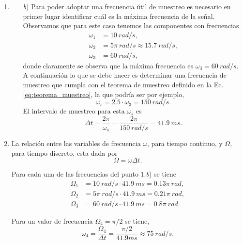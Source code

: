 \documentclass[10pt,a4paper]{article}
\begin{document}
\begin{enumerate}
\item 
\begin{enumerate}
\item[\textit{b})]
Para poder adoptar una frecuencia útil de muestreo es necesario en primer lugar identificar cuál es la máxima frecuencia de la señal. Observamos que para este caso tenemos las componentes con frecuencias
\begin{align}
\omega_1 &= 10 ~rad/s, \\
\omega_2 &= 5\pi ~rad/s \approx 15.7 ~rad/s, \\
\omega_3 &= 60 ~rad/s,
\end{align}
donde claramente se observa que la máxima frecuencia es $\omega_3 = 60 ~rad/s$. A continuación lo que se debe hacer es determinar una frecuencia de muestreo que cumpla con el teorema de muestreo definido en la Ec. \ref{eq:teorema_muestreo}, la que podría ser por ejemplo,
\begin{equation}
\omega_s = 2.5 \cdot\omega_3 = 150 ~rad/s.
\end{equation}
El intervalo de muestreo para esta $\omega_s$ es
\begin{equation}
\Delta t=\frac{2\pi}{\omega_s}=\frac{2\pi}{150~rad/s}=41.9~ms.
\end{equation}
\end{enumerate}


\item
La relación entre las variables de frecuencia $\omega$, para tiempo continuo, y $\Omega$, para tiempo discreto, esta dada por
\begin{equation}
\Omega = \omega \Delta t.
\end{equation}

Para cada una de las frecuencias del punto 1.\textit{b}) se tiene
\begin{align}
\Omega_1 &= 10 ~rad/s \cdot 41.9~ms = 0.13\pi ~rad, \\
\Omega_2 &= 5\pi ~rad/s \cdot 41.9~ms = 0.21\pi ~rad, \\
\Omega_3 &= 60 ~rad/s\cdot 41.9~ms = 0.8\pi ~rad.
\end{align}

Para un valor de frecuencia $\Omega_4=\pi/2$ se tiene,
\begin{equation}
\omega_4=\frac{\Omega_4}{\Delta t}=\frac{\pi/2}{41.9ms}\approx 75 ~rad/s.
\end{equation}


\end{enumerate}
\end{document}
